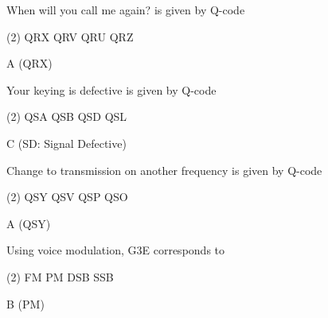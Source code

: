 \documentclass[a4paper]{article}
\begin{document}
\begin{question}\apostrophe{}When will you call me again?\apostrophe{} is given by Q-code
	\begin{tasks}(2)
		\task QRX
		\task QRV
		\task QRU
		\task QRZ
	\end{tasks}
\end{question}

\begin{solution}
	A (QRX)
\end{solution}

\vspace{5mm}



\begin{question}\apostrophe{}Your keying is defective\apostrophe{} is given by Q-code
	\begin{tasks}(2)
		\task QSA
		\task QSB
		\task QSD
		\task QSL
	\end{tasks}
\end{question}

\begin{solution}
	C (SD: Signal Defective)
\end{solution}

\vspace{5mm}



\begin{question}\apostrophe{}Change to transmission on another frequency\apostrophe{} is given by Q-code
	\begin{tasks}(2)
		\task QSY
		\task QSV
		\task QSP
		\task QSO
	\end{tasks}
\end{question}

\begin{solution}
	A (QSY)
\end{solution}

\vspace{5mm}



\begin{question}Using voice modulation, G3E corresponds to
	\begin{tasks}(2)
		\task FM
		\task PM
		\task DSB
		\task SSB
	\end{tasks}
\end{question}

\begin{solution}
	B (PM)
\end{solution}

\vspace{5mm}
\end{document}
